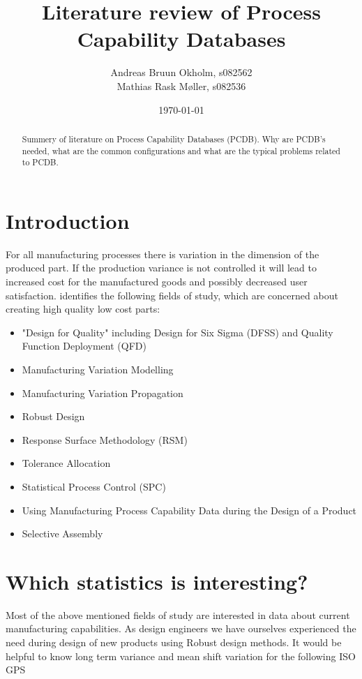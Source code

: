 \documentclass[aip,amsmath,reprint, author-year]{revtex4-1}
\begin{document}
\begin{abstract}
Summery of literature on Process Capability Databases (PCDB). Why are PCDB's needed, what are the common configurations and what are the typical problems related to PCDB.
\end{abstract}

\title{Literature review of Process Capability Databases}
\author{Andreas Bruun Okholm, s082562\\
Mathias Rask Møller, s082536 }  
 
\date{\today}
\maketitle


\section{Introduction}
For all manufacturing processes there is variation in the dimension of the produced part. 
If the production variance is not controlled it will lead to increased cost for the manufactured goods and possibly decreased user satisfaction.
\citet{kern2003forecasting} identifies the following fields of study, which are concerned about creating high quality low cost parts: 
\begin{itemize}
\item "Design for Quality" including Design for Six Sigma (DFSS) and Quality Function Deployment (QFD)
\item Manufacturing Variation Modelling
\item Manufacturing Variation Propagation
\item Robust Design
\item Response Surface Methodology (RSM)
\item Tolerance Allocation
\item Statistical Process Control (SPC)
\item Using Manufacturing Process Capability Data during the Design of a Product
\item Selective Assembly
\end{itemize}

\section{Which statistics is interesting?}
Most of the above mentioned fields of study are interested in data about current manufacturing capabilities. 
As design engineers we have ourselves experienced the need during design of new products using Robust design methods. 
It would be helpful to know long term variance and mean shift variation for the following ISO GPS  
\end{document}
